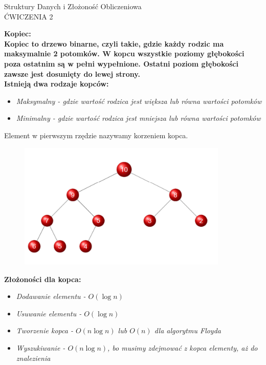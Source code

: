 \documentclass[a4paper,12pt]{article}
\newcommand{\h}[1]{\noindent \bf #1 \rm \\ \noindent}
\newcommand{\italic}[1]{\it #1 \rm}
\begin{document}
\begin{center}
	\LARGE
	Struktury Danych i Złożoność Obliczeniowa \\
	\large
	ĆWICZENIA 2 
\end{center}
\vspace{1cm}

\h{Kopiec:}
Kopiec to drzewo binarne, czyli takie, gdzie każdy rodzic ma maksymalnie 2 potomków. W kopcu wszystkie poziomy głębokości poza ostatnim są w pełni wypełnione. Ostatni poziom głębokości zawsze jest dosunięty do lewej strony.\\

\noindent
Istnieją dwa rodzaje kopców:
\begin{itemize}
	\item \italic{Maksymalny} - gdzie wartość rodzica jest większa lub równa wartości potomków
	\item \italic{Minimalny} - gdzie wartość rodzica jest mniejsza lub równa wartości potomków
\end{itemize}
\vspace{5mm}

\noindent
Element w pierwszym rzędzie nazywamy korzeniem kopca.\\

\begin{figure}[H]
	\centering
	\includegraphics[width=10cm]{fig1.png}
\end{figure}

\h{Złożoności dla kopca:}
\begin{itemize}
	\item \italic{Dodawanie elementu} - $O(\log n)$
	\item \italic{Usuwanie elementu} - $O(\log n)$
	\item \italic{Tworzenie kopca} - $O(n\log n)$ lub $O(n)$ dla algorytmu Floyda
	\item \italic{Wyszukiwanie} - $O(n\log n)$, bo musimy zdejmować z kopca elementy, aż do znalezienia
\end{itemize}
\vspace{5mm}
\end{document}
